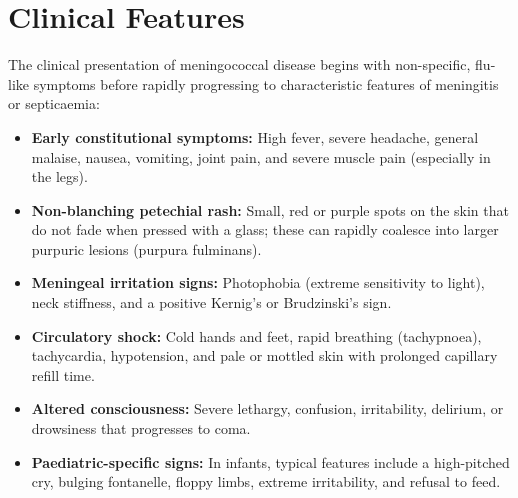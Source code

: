 \section*{Clinical Features}
The clinical presentation of meningococcal disease begins with non-specific, flu-like symptoms before rapidly progressing to characteristic features of meningitis or septicaemia:
\begin{itemize}
    \item \textbf{Early constitutional symptoms:} High fever, severe headache, general malaise, nausea, vomiting, joint pain, and severe muscle pain (especially in the legs).
    \item \textbf{Non-blanching petechial rash:} Small, red or purple spots on the skin that do not fade when pressed with a glass; these can rapidly coalesce into larger purpuric lesions (purpura fulminans).
    \item \textbf{Meningeal irritation signs:} Photophobia (extreme sensitivity to light), neck stiffness, and a positive Kernig's or Brudzinski's sign.
    \item \textbf{Circulatory shock:} Cold hands and feet, rapid breathing (tachypnoea), tachycardia, hypotension, and pale or mottled skin with prolonged capillary refill time.
    \item \textbf{Altered consciousness:} Severe lethargy, confusion, irritability, delirium, or drowsiness that progresses to coma.
    \item \textbf{Paediatric-specific signs:} In infants, typical features include a high-pitched cry, bulging fontanelle, floppy limbs, extreme irritability, and refusal to feed.
\end{itemize}

